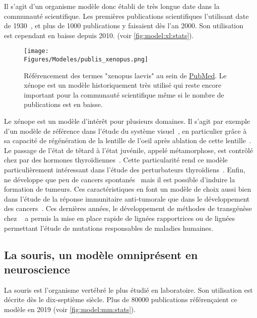 \documentclass[\main/main.tex]{subfiles}
\begin{document}
%
Il s'agit d'un organisme modèle donc établi de très longue date dans la communauté scientifique.
%
Les premières publications scientifiques l'utilisant date de 1930~\cite{edgeworth_1930},
et plus de 1000 publications y faisaient dès l'an 2000.
%
Son utilisation est cependant en baisse depuis 2010. (voir \autoref{fig:model:xl:stats}).
%

\begin{figure}[h!]{\textwidth} 
    \centering
       \centering \texttt{[image: \\Figures/Modeles/publis\_xenopus.png]}
       \caption{
            \label{fig:model:xl:stats}Référencement des termes "xenopus laevis" au sein de \href{https://pubmed.ncbi.nlm.nih.gov/?term=xenopus+laevis&sort=pubdate}{PubMed}.\newline
            Le xénope est un modèle historiquement très utilisé qui reste encore important pour la communauté scientifique même si le nombre de publications est en baisse.
            }
\end{figure}

%
Le xénope est un modèle d'intérêt pour plusieurs domaines.
%
Il s'agit par exemple d'un modèle de référence dans l'étude du système visuel~\cite{viet_2020,Rahman_2020,kha_2020},
en particulier grâce à sa capacité de régénération de la lentille de l'oeil après ablation de cette lentille~\cite{henry_2019}.
%
Le passage de l'état de têtard à l'état juvénile, appelé métamorphose, est contrôlé chez \xl{} par des hormones thyroïdiennes~\cite{brown_1996,furlow_2006}.
%
Cette particularité rend ce modèle particulièrement intéressant dans l'étude des perturbateurs thyroïdiens~\cite{li_2019,li_2019a,Couderq_2020}.
%
Enfin, \xl{} ne développe que peu de cancers spontanés~\cite{ruben_2007} mais il est possible d'induire la formation de tumeurs. Ces caractéristiques en font un modèle de choix aussi bien dans l'étude de la réponse immunitaire anti-tumorale que dans le développement des cancers~\cite{hardwick_2015}.
%
 Ces dernières années, le développement de méthodes de transgénèse chez \xl{}~\cite{tandon_2017} a permis la mise en place rapide de lignées rapportrices ou de lignées permettant l'étude de mutations responsables de maladies humaines.

    \subsection{La souris, un modèle omniprésent en neuroscience}

La souris est l'organisme vertébré le plus étudié en laboratoire.
%
Son utilisation  est décrite dès le dix-septième siècle.
%
Plus de 80000 publications référençaient ce modèle en 2019 (voir \autoref{fig:model:mm:stats}).
\end{document}
